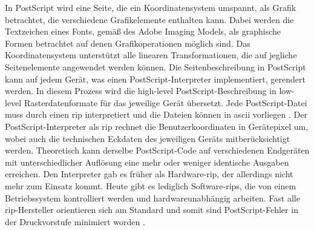 In PostScript wird eine Seite, die ein Koordinatensystem umspannt, als Grafik betrachtet, die verschiedene Grafikelemente enthalten kann. Dabei werden die Textzeichen eines Fonts, gemäß des Adobe Imaging Models, als graphische Formen betrachtet auf denen Grafikoperationen möglich sind. Das Koordinatensystem unterstützt alle linearen Transformationen, die auf jegliche Seitenelemente angewendet werden können. Die Seitenbeschreibung in PostScript kann auf jedem Gerät, was einen PostScript-Interpreter implementiert, gerendert werden. In diesem Prozess wird die high-level PostScript-Beschreibung in low-level Rasterdatenformate für das jeweilige Gerät übersetzt. Jede PostScript-Datei muss durch einen \gls{rip} interpretiert und die Dateien können in \gls{ascii} vorliegen \cite{adobe-postscript}. Der PostScript-Interpreter als \gls{rip} rechnet die Benutzerkoordinaten in Gerätepixel um, wobei auch die technischen Eckdaten des jeweiligen Geräts mitberücksichtigt werden. Theoretisch kann derselbe PostScript-Code auf verschiedenen Endgeräten mit unterschiedlicher Auflösung eine mehr oder weniger identische Ausgaben erreichen. Den Interpreter gab es früher als Hardware-\gls{rip}, der allerdings nicht mehr zum Einsatz kommt. Heute gibt es lediglich Software-\gls{rip}s, die von einem Betriebssystem kontrolliert werden und hardwareunabhängig arbeiten. Fast alle \gls{rip}-Hersteller orientieren sich am Standard und somit sind PostScript-Fehler in der Druckvorstufe minimiert worden \cite{schneeberger}.

